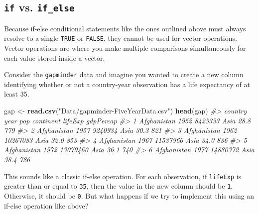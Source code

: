 \documentclass[]{book}
\newenvironment{Shaded}{\begin{snugshade}}{\end{snugshade}}
\newcommand{\CommentTok}[1]{\textcolor[rgb]{0.56,0.35,0.01}{\textit{#1}}}
\newcommand{\KeywordTok}[1]{\textcolor[rgb]{0.13,0.29,0.53}{\textbf{#1}}}
\newcommand{\NormalTok}[1]{#1}
\newcommand{\StringTok}[1]{\textcolor[rgb]{0.31,0.60,0.02}{#1}}
\begin{document}
\hypertarget{if-vs.-if_else}{%
\subsection{\texorpdfstring{\texttt{if} vs. \texttt{if\_else}}{if vs. if\_else}}\label{if-vs.-if_else}}

Because if-else conditional statements like the ones outlined above must always resolve to a single \texttt{TRUE} or \texttt{FALSE}, they cannot be used for vector operations. Vector operations are where you make multiple comparisons simultaneously for each value stored inside a vector.

Consider the \texttt{gapminder} data and imagine you wanted to create a new column identifying whether or not a country-year observation has a life expectancy of at least 35.

\begin{Shaded}
\begin{Highlighting}[]
\NormalTok{gap <-}\StringTok{ }\KeywordTok{read.csv}\NormalTok{(}\StringTok{"Data/gapminder-FiveYearData.csv"}\NormalTok{)}
\KeywordTok{head}\NormalTok{(gap)}
\CommentTok{#>       country year      pop continent lifeExp gdpPercap}
\CommentTok{#> 1 Afghanistan 1952  8425333      Asia    28.8       779}
\CommentTok{#> 2 Afghanistan 1957  9240934      Asia    30.3       821}
\CommentTok{#> 3 Afghanistan 1962 10267083      Asia    32.0       853}
\CommentTok{#> 4 Afghanistan 1967 11537966      Asia    34.0       836}
\CommentTok{#> 5 Afghanistan 1972 13079460      Asia    36.1       740}
\CommentTok{#> 6 Afghanistan 1977 14880372      Asia    38.4       786}
\end{Highlighting}
\end{Shaded}

This sounds like a classic if-else operation. For each observation, if \texttt{lifeExp} is greater than or equal to \texttt{35}, then the value in the new column should be \texttt{1}. Otherwise, it should be \texttt{0}. But what happens if we try to implement this using an if-else operation like above?
\end{document}
